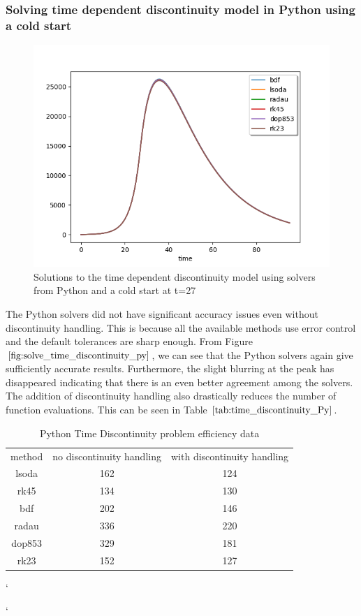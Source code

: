 \subsubsection{Solving time dependent discontinuity model in Python using a cold start} 
\begin{figure}[H]
\centering
\includegraphics[width=0.7\linewidth]{./figures/solve_time_discontinuity_py}
\caption{Solutions to the time dependent discontinuity model using solvers from Python and a cold start at t=27}
\label{fig:solve_time_discontinuity_py}
\end{figure}
The Python solvers did not have significant accuracy issues even without discontinuity handling. This is because all the available methods use error control and the default tolerances are sharp enough. From Figure $\ref{fig:solve_time_discontinuity_py}$, we can see that the Python solvers again give sufficiently accurate results. Furthermore, the slight blurring at the peak has disappeared indicating that there is an even better agreement among the solvers. The addition of discontinuity handling also drastically reduces the number of function evaluations. This can be seen in Table $\ref{tab:time_discontinuity_Py}$.

\begin{table}[H]
\caption {Python Time Discontinuity problem efficiency data} \label{tab:time_discontinuity_Py} 
\begin{center}
\begin{tabular}{ c c c }
method & no discontinuity handling & with discontinuity handling \\ 
lsoda & 162 & 124 \\
rk45 & 134 & 130 \\
bdf & 202 & 146 \\
radau & 336 & 220 \\
dop853 & 329 & 181 \\
rk23 & 152 & 127 \\
\end{tabular}`
\end{center}`
\end{table}

